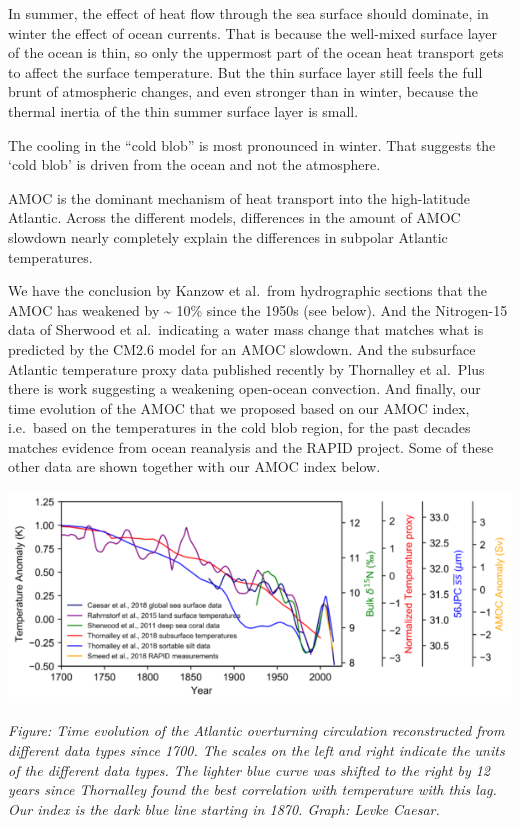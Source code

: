\documentclass[
]{book}
\begin{document}
In summer, the effect of heat flow through the sea surface should dominate, in winter the effect of ocean currents.
That is because the well-mixed surface layer of the ocean is thin, so only the uppermost part of the ocean heat transport gets to affect the surface temperature. But the thin surface layer still feels the full brunt of atmospheric changes, and even stronger than in winter, because the thermal inertia of the thin summer surface layer is small.

The cooling in the ``cold blob'' is most pronounced in winter.
That suggests the `cold blob' is driven from the ocean and not the atmosphere.

AMOC is the dominant mechanism of heat transport into the high-latitude Atlantic.
Across the different models, differences in the amount of AMOC slowdown nearly completely explain the differences in subpolar Atlantic temperatures.

We have the conclusion by Kanzow et al.~from hydrographic sections that the AMOC has weakened by \textasciitilde{} 10\% since the 1950s (see below). And the Nitrogen-15 data of Sherwood et al.~indicating a water mass change that matches what is predicted by the CM2.6 model for an AMOC slowdown. And the subsurface Atlantic temperature proxy data published recently by Thornalley et al.~Plus there is work suggesting a weakening open-ocean convection. And finally, our time evolution of the AMOC that we proposed based on our AMOC index, i.e.~based on the temperatures in the cold blob region, for the past decades matches evidence from ocean reanalysis and the RAPID project. Some of these other data are shown together with our AMOC index below.

\includegraphics{fig/AMOC-estimates.png}

\emph{Figure: Time evolution of the Atlantic overturning circulation reconstructed from different data types since 1700. The scales on the left and right indicate the units of the different data types. The lighter blue curve was shifted to the right by 12 years since Thornalley found the best correlation with temperature with this lag. Our index is the dark blue line starting in 1870. Graph: Levke Caesar.}
\end{document}
